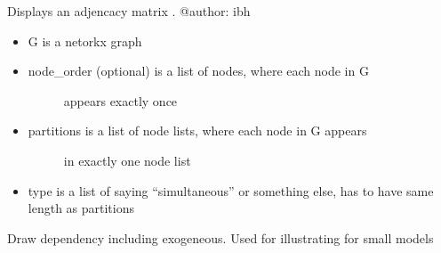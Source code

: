\documentclass[letterpaper,10pt,english]{sphinxmanual}
\begin{document}
\sphinxAtStartPar
Displays an adjencacy matrix
.
@author: ibh

\begin{fulllineitems}
\label{\detokenize{unsorted/modelnet:modelnet.draw_adjacency_matrix}}
\pysigstartsignatures
{}
\pysigstopsignatures\begin{itemize}
\item {} 
\sphinxAtStartPar
G is a netorkx graph

\item {} \begin{description}
\item[{node\_order (optional) is a list of nodes, where each node in G}] \leavevmode
\sphinxAtStartPar
appears exactly once

\end{description}

\item {} \begin{description}
\item[{partitions is a list of node lists, where each node in G appears}] \leavevmode
\sphinxAtStartPar
in exactly one node list

\end{description}

\item {} 
\sphinxAtStartPar
type is a list of saying “simultaneous” or something else, has to have same length as partitions

\end{itemize}

\end{fulllineitems}


\begin{fulllineitems}
\label{\detokenize{unsorted/modelnet:modelnet.drawendoexo}}
\pysigstartsignatures
{}
\pysigstopsignatures
\sphinxAtStartPar
Draw dependency including exogeneous. Used for illustrating for small models

\end{fulllineitems}
\end{document}
